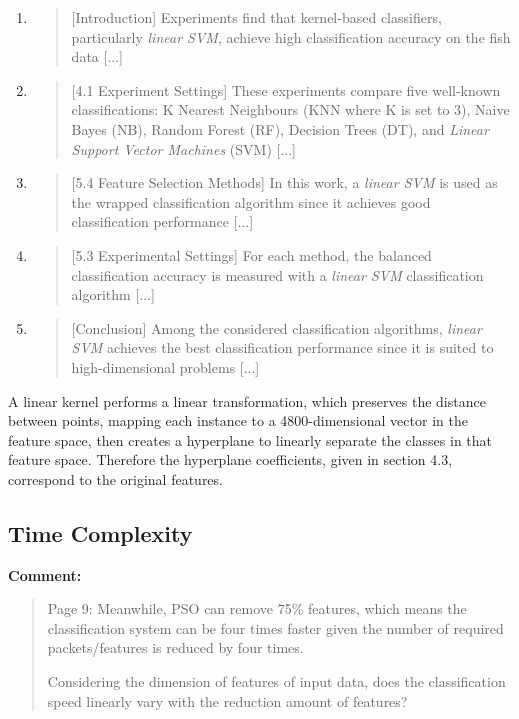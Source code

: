 \documentclass[runningheads]{llncs}
\begin{document}
\begin{enumerate}
  \item 
  \begin{quote}
    [Introduction]
    Experiments find that kernel-based classifiers, particularly \emph{linear SVM}, achieve high classification accuracy on the fish data [...]
  \end{quote}
  \item 
  \begin{quote}
    [4.1 Experiment Settings]
    These experiments compare five well-known classifications: K Nearest Neighbours (KNN where K is set to 3), Naive Bayes (NB), Random Forest (RF), Decision Trees (DT), and \emph{Linear Support Vector Machines} (SVM) [...]
  \end{quote}
  \item 
  \begin{quote}
    [5.4 Feature Selection Methods]
    In this work, a \emph{linear SVM} is used as the wrapped classification algorithm since it achieves good classification performance [...]
  \end{quote}
  \item \begin{quote}
    [5.3 Experimental Settings]
    For each method, the balanced classification accuracy is measured with a \emph{linear SVM} classification algorithm \cite{sklearn2021feature} [...]
  \end{quote}
  \item \begin{quote}
    [Conclusion]
    Among the considered classification algorithms, \emph{linear SVM} achieves the best classification performance since it is suited to high-dimensional problems [...]
  \end{quote}
\end{enumerate}

A linear kernel performs a linear transformation, which preserves the distance between points, mapping each instance to a 4800-dimensional vector in the feature space, then creates a hyperplane to linearly separate the classes in that feature space. Therefore the hyperplane coefficients, given in section 4.3, correspond to the original features.

\subsection{Time Complexity}

\noindent\textbf{Comment:}

\begin{quote}
  Page 9: Meanwhile, PSO can remove 75\% features, which means the classification system can be four times faster given the number of required packets/features is reduced by four times.

  Considering the dimension of features of input data, does the classification speed linearly vary with the reduction amount of features?
\end{quote}
\end{document}

